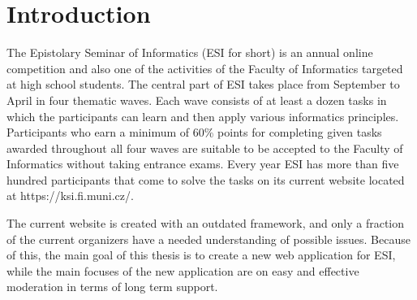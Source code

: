 \documentclass[
  digital, %
  oneside, %
  lof,     %
  lot,     %
]{fithesis4}
\begin{document}
\clearpage
\printnoidxglossary[title={Abbreviations}, type=\acronymtype]
\printnoidxglossary[title={Glossary}]

\chapter*{Introduction}

\mdstart

The Epistolary Seminar of Informatics (ESI for short) is an annual online competition and also one of the activities of the Faculty of Informatics targeted at high school students. The central part of ESI takes place from September to April in four thematic waves. Each wave consists of at least a dozen tasks in which the participants can learn and then apply various informatics principles. Participants who earn a minimum of 60\% points for completing given tasks awarded throughout all four waves are suitable to be accepted to the Faculty of Informatics without taking entrance exams. Every year ESI has more than five hundred participants that come to solve the tasks on its current website located at https://ksi.fi.muni.cz/.

The current website is created with an outdated framework, and only a fraction of the current organizers have a needed understanding of possible issues. Because of this, the main goal of this thesis is to create a new web application for ESI, while the main focuses of the new application are on easy and effective moderation in terms of long term support.
\end{document}
